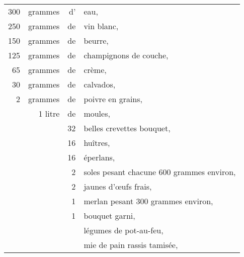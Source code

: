 \footnotesize
\begin{longtable}{rrrp{16em}}
    300 & grammes & d' & eau,                                                                             \\
    250 & grammes & de & vin blanc,                                                                       \\
    150 & grammes & de & beurre,                                                                          \\
    125 & grammes & de & champignons de couche,                                                           \\
     65 & grammes & de & crème,                                                                           \\
     30 & grammes & de & calvados,                                                                        \\
      2 & grammes & de & poivre en grains,                                                                \\
        & 1 litre & de & moules,                                                                          \\
        &         & 32 & belles crevettes bouquet,                                                        \\
        &         & 16 & huîtres,                                                                         \\
        &         & 16 & éperlans,                                                                        \\
        &         &  2 & soles pesant chacune 600 grammes environ,                                        \\
        &         &  2 & jaunes d'œufs frais,                                                             \\
        &         &  1 & merlan pesant 300 grammes environ,                                               \\
        &         &  1 & bouquet garni,                                                                   \\
        &         &    & légumes de pot-au-feu,                                                           \\
        &         &    & mie de pain rassis tamisée,                                                      \\

\end{longtable}
